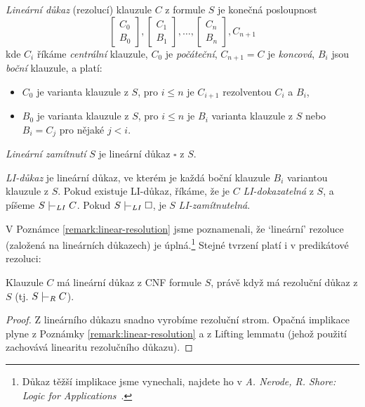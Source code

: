 \begin{definition}
    \emph{Lineární důkaz} (rezolucí) klauzule $C$ z formule $S$ je konečná posloupnost
    $$
    \begin{bmatrix}
        C_0 \\
        B_0
    \end{bmatrix},
    \begin{bmatrix}
        C_1 \\
        B_1
    \end{bmatrix},\dots,
    \begin{bmatrix}
        C_n \\
        B_n
    \end{bmatrix},
    C_{n+1}
    $$
    kde $C_i$ říkáme \emph{centrální} klauzule, $C_0$ je \emph{počáteční}, $C_{n+1}=C$ je \emph{koncová}, $B_i$ jsou \emph{boční} klauzule, a platí:
    \begin{itemize}
        \item $C_0$ je varianta klauzule z $S$, pro $i\leq n$ je $C_{i+1}$ rezolventou $C_i$ a $B_i$,
        \item $B_0$ je varianta klauzule z $S$, pro $i\leq n$ je $B_i$ varianta klauzule z $S$ nebo $B_i=C_j$ pro nějaké $j<i$.
    \end{itemize}
    \emph{Lineární zamítnutí} $S$ je lineární důkaz $\square$ z $S$.

    \emph{LI-důkaz} je lineární důkaz, ve kterém je každá boční klauzule $B_i$ variantou klauzule z $S$. Pokud existuje LI-důkaz, říkáme, že je $C$ \emph{LI-dokazatelná} z $S$, a píšeme $S\proves_{LI}C$. Pokud $S\proves_{LI}\square$, je $S$ \emph{LI-zamítnutelná}.
\end{definition}

V Poznámce \ref{remark:linear-resolution} jsme poznamenali, že `lineární' rezoluce (založená na lineárních důkazech) je úplná.\footnote{Důkaz těžší implikace jsme vynechali, najdete ho v \emph{A. Nerode, R. Shore: Logic for Applications}~\cite{nerode_logic_2012}.} Stejné tvrzení platí i v predikátové rezoluci:

\begin{theorem}
Klauzule $C$ má lineární důkaz z CNF formule $S$, právě když má rezoluční důkaz z $S$ (tj. $S\proves_R C$).
\end{theorem}
\begin{proof}
Z lineárního důkazu snadno vyrobíme rezoluční strom. Opačná implikace plyne z Poznámky \ref{remark:linear-resolution} a z Lifting lemmatu (jehož použití zachovává linearitu rezolučního důkazu).
\end{proof}


